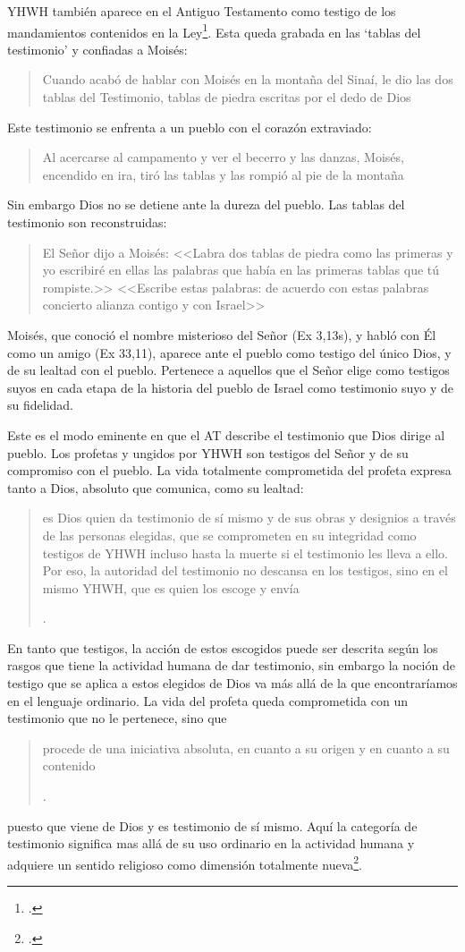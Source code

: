 YHWH también aparece en el Antiguo Testamento como testigo de los mandamientos contenidos en la Ley\footcite[Cf.][115]{prades2015testimonio}. Esta queda grabada en las `tablas del testimonio' y confiadas a Moisés: \blockquote[][\,(Ex 31,18)]{Cuando acabó de hablar con Moisés en la montaña del Sinaí, le dio las dos tablas del Testimonio, tablas de piedra escritas por el dedo de Dios}. Este testimonio se enfrenta a un pueblo con el corazón extraviado: \blockquote[][\,(Ex 32,19)]{Al acercarse al campamento y ver el becerro y las danzas, Moisés, encendido en ira, tiró las tablas y las rompió al pie de la montaña}. Sin embargo Dios no se detiene ante la dureza del pueblo. Las tablas del testimonio son reconstruidas: \blockquote[][\,(Ex 34,1.27)]{El Señor dijo a Moisés: <<Labra dos tablas de piedra como las primeras y yo escribiré en ellas las palabras que había en las primeras tablas que tú rompiste.>> \textelp{} <<Escribe estas palabras: de acuerdo con estas palabras concierto alianza contigo y con Israel>>}. Moisés, que conoció el nombre misterioso del Señor (Ex 3,13s), y habló con Él como un amigo (Ex 33,11), aparece ante el pueblo como testigo del único Dios, y de su lealtad con el pueblo. Pertenece a aquellos que el Señor elige como testigos suyos en cada etapa de la historia del pueblo de Israel como testimonio suyo y de su fidelidad.

Este es el modo eminente en que el AT describe el testimonio que Dios dirige al pueblo. Los profetas y ungidos por YHWH son testigos del Señor y de su compromiso con el pueblo. La vida totalmente comprometida del profeta expresa tanto a Dios, absoluto que comunica, como su lealtad: \blockquote[{\Cite[116-117]{prades2015testimonio}}.]{es Dios quien da testimonio de sí mismo y de sus obras y designios a través de las personas elegidas, que se comprometen en su integridad como testigos de YHWH incluso hasta la muerte si el testimonio les lleva a ello. Por eso, la autoridad del testimonio no descansa en los testigos, sino en el mismo YHWH, que es quien los escoge y envía}. En tanto que testigos, la acción de estos escogidos puede ser descrita según los rasgos que tiene la actividad humana de dar testimonio, sin embargo la noción de testigo que se aplica a estos elegidos de Dios va más allá de la que encontraríamos en el lenguaje ordinario. La vida del profeta queda comprometida con un testimonio que no le pertenece, sino que \blockquote[{\Cite[118]{prades2015testimonio}}.]{procede de una iniciativa absoluta, en cuanto a su origen y en cuanto a su contenido} puesto que viene de Dios y es testimonio de sí mismo. Aquí la categoría de testimonio significa mas allá de su uso ordinario en la actividad humana y adquiere un sentido religioso como dimensión totalmente nueva\footcite[Cf.][118]{prades2015testimonio}.

